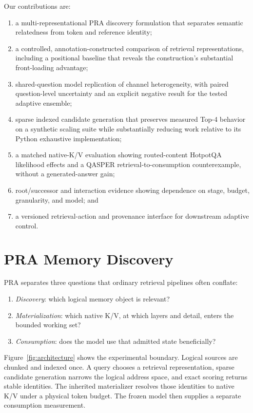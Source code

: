 \documentclass[11pt]{article}
\begin{document}
Our contributions are:
\begin{enumerate}[leftmargin=*]
\item a multi-representational PRA discovery formulation that separates semantic relatedness from token and reference identity;
\item a controlled, annotation-constructed comparison of retrieval representations, including a positional baseline that reveals the construction's substantial front-loading advantage;
\item shared-question model replication of channel heterogeneity, with paired question-level uncertainty and an explicit negative result for the tested adaptive ensemble;
\item sparse indexed candidate generation that preserves measured Top-4 behavior on a synthetic scaling suite while substantially reducing work relative to its Python exhaustive implementation;
\item a matched native-K/V evaluation showing routed-content HotpotQA likelihood effects and a QASPER retrieval-to-consumption counterexample, without a generated-answer gain;
\item root/successor and interaction evidence showing dependence on stage, budget, granularity, and model; and
\item a versioned retrieval-action and provenance interface for downstream adaptive control.
\end{enumerate}

\section{PRA Memory Discovery}
PRA separates three questions that ordinary retrieval pipelines often conflate:
\begin{enumerate}[leftmargin=*]
\item \emph{Discovery}: which logical memory object is relevant?
\item \emph{Materialization}: which native K/V, at which layers and detail, enters the bounded working set?
\item \emph{Consumption}: does the model use that admitted state beneficially?
\end{enumerate}
Figure~\ref{fig:architecture} shows the experimental boundary. Logical sources are chunked and indexed once. A query chooses a retrieval representation, sparse candidate generation narrows the logical address space, and exact scoring returns stable identities. The inherited materializer resolves those identities to native K/V under a physical token budget. The frozen model then supplies a separate consumption measurement.
\end{document}
